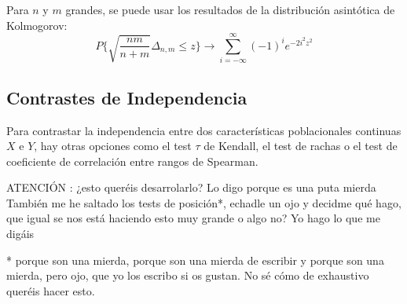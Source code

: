\documentclass[a4paper,12pt]{article}
\begin{document}
Para $n$ y $m$ grandes, se puede usar los resultados de la distribución asintótica de Kolmogorov:
$$P\{ \sqrt{\frac{nm}{n+m}}\Delta_{n,m}\leq z\}\longrightarrow \sum^{\infty}_{i=-\infty}(-1)^i e^{-2i^2z^2}$$


\subsection{Contrastes de Independencia}
Para contrastar la independencia entre dos características poblacionales continuas $X$ e $Y$, hay otras opciones como el test $\tau$ de Kendall, el test de rachas o el test de coeficiente de correlación entre rangos de Spearman.

ATENCIÓN : ¿esto queréis desarrolarlo? Lo digo porque es una puta mierda\\
También me he saltado los tests de posición*, echadle un ojo y decidme qué hago, que igual se nos está haciendo esto muy grande o algo no? Yo hago lo que me digáis

* porque son una mierda, porque son una mierda de escribir y porque son una mierda, pero ojo, que yo los escribo si os gustan. No sé cómo de exhaustivo queréis hacer esto.





































\end{document}
